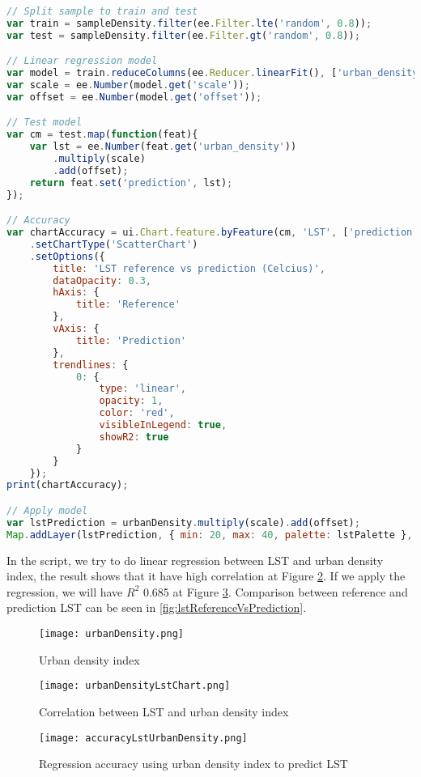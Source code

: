 \begin{lstlisting}[language=JavaScript, label={code:urbanDensity}, caption={GEE Script to model urban density and LST}]
// Split sample to train and test
var train = sampleDensity.filter(ee.Filter.lte('random', 0.8));
var test = sampleDensity.filter(ee.Filter.gt('random', 0.8));

// Linear regression model
var model = train.reduceColumns(ee.Reducer.linearFit(), ['urban_density', 'LST']);
var scale = ee.Number(model.get('scale'));
var offset = ee.Number(model.get('offset'));

// Test model
var cm = test.map(function(feat){
	var lst = ee.Number(feat.get('urban_density'))
		.multiply(scale)
		.add(offset);
	return feat.set('prediction', lst);
});

// Accuracy
var chartAccuracy = ui.Chart.feature.byFeature(cm, 'LST', ['prediction'])
	.setChartType('ScatterChart')
	.setOptions({
		title: 'LST reference vs prediction (Celcius)',
		dataOpacity: 0.3,
		hAxis: {
			title: 'Reference'
		},
		vAxis: {
			title: 'Prediction'
		},
		trendlines: {
			0: {
				type: 'linear',
				opacity: 1,
				color: 'red',
				visibleInLegend: true,
				showR2: true
			}
		}
	});
print(chartAccuracy);

// Apply model
var lstPrediction = urbanDensity.multiply(scale).add(offset);
Map.addLayer(lstPrediction, { min: 20, max: 40, palette: lstPalette }, 'LST prediction from urban density');
\end{lstlisting}

In the script, we try to do linear regression between LST and urban density index, the result shows that it have high correlation at Figure \ref{fig:lstUrbanDensityCorrelation}. If we apply the regression, we will have $R^2$ 0.685 at Figure \ref{fig:lstUrbanDensityAccuracy}. Comparison between reference and prediction LST can be seen in \ref{fig:lstReferenceVsPrediction}.

\begin{figure}
	\label{fig:urbanDensity}
	\centering
	\texttt{[image: urbanDensity.png]}
	\caption{Urban density index}
\end{figure}

\begin{figure}[htbp]
	\label{fig:lstUrbanDensityCorrelation}
	\centering
	\texttt{[image: urbanDensityLstChart.png]}
	\caption{Correlation between LST and urban density index}
\end{figure}

\begin{figure}[htbp]
	\label{fig:lstUrbanDensityAccuracy}
	\centering
	\texttt{[image: accuracyLstUrbanDensity.png]}
	\caption{Regression accuracy using urban density index to predict LST}
\end{figure}

